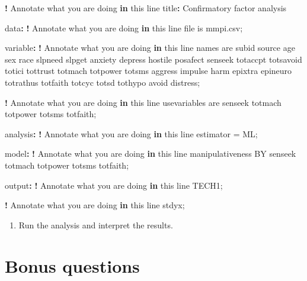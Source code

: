 \documentclass[
]{book}
\newenvironment{Shaded}{\begin{snugshade}}{\end{snugshade}}
\newcommand{\ControlFlowTok}[1]{\textcolor[rgb]{0.13,0.29,0.53}{\textbf{#1}}}
\newcommand{\NormalTok}[1]{#1}
\newcommand{\OtherTok}[1]{\textcolor[rgb]{0.56,0.35,0.01}{#1}}
\newcommand{\SpecialCharTok}[1]{\textcolor[rgb]{0.81,0.36,0.00}{\textbf{#1}}}
\providecommand{\tightlist}{%
  \setlength{\itemsep}{0pt}\setlength{\parskip}{0pt}}
\begin{document}
\begin{Shaded}
\begin{Highlighting}[]
\SpecialCharTok{!}\NormalTok{ Annotate what you are doing }\ControlFlowTok{in}\NormalTok{ this line}
\NormalTok{title}\SpecialCharTok{:}\NormalTok{ Confirmatory factor analysis}

\NormalTok{data}\SpecialCharTok{:}
\SpecialCharTok{!}\NormalTok{ Annotate what you are doing }\ControlFlowTok{in}\NormalTok{ this line}
\NormalTok{file is mmpi.csv;}

\NormalTok{variable}\SpecialCharTok{:}
\SpecialCharTok{!}\NormalTok{ Annotate what you are doing }\ControlFlowTok{in}\NormalTok{ this line}
\NormalTok{names are subid source age sex race slpneed slpget anxiety depress}
\NormalTok{hostile posafect senseek totaccpt totsavoid totici tottrust totmach}
\NormalTok{totpower totsms aggress impulse harm epixtra epineuro totrathus}
\NormalTok{totfaith totcyc totsd tothypo avoid distress;}

\SpecialCharTok{!}\NormalTok{ Annotate what you are doing }\ControlFlowTok{in}\NormalTok{ this line}
\NormalTok{usevariables are senseek totmach totpower totsms totfaith;}

\NormalTok{analysis}\SpecialCharTok{:}
\SpecialCharTok{!}\NormalTok{ Annotate what you are doing }\ControlFlowTok{in}\NormalTok{ this line}
\NormalTok{estimator }\OtherTok{=}\NormalTok{ ML;}

\NormalTok{model}\SpecialCharTok{:}
\SpecialCharTok{!}\NormalTok{ Annotate what you are doing }\ControlFlowTok{in}\NormalTok{ this line}
\NormalTok{manipulativeness BY senseek totmach totpower totsms totfaith;}

\NormalTok{output}\SpecialCharTok{:}
\SpecialCharTok{!}\NormalTok{ Annotate what you are doing }\ControlFlowTok{in}\NormalTok{ this line}
\NormalTok{TECH1;}

\SpecialCharTok{!}\NormalTok{ Annotate what you are doing }\ControlFlowTok{in}\NormalTok{ this line}
\NormalTok{stdyx;}
\end{Highlighting}
\end{Shaded}

\begin{enumerate}
\def\labelenumi{\arabic{enumi}.}
\setcounter{enumi}{2}
\tightlist
\item
  Run the analysis and interpret the results.
\end{enumerate}

\section{Bonus questions}\label{bonus-questions-1}
\end{document}
